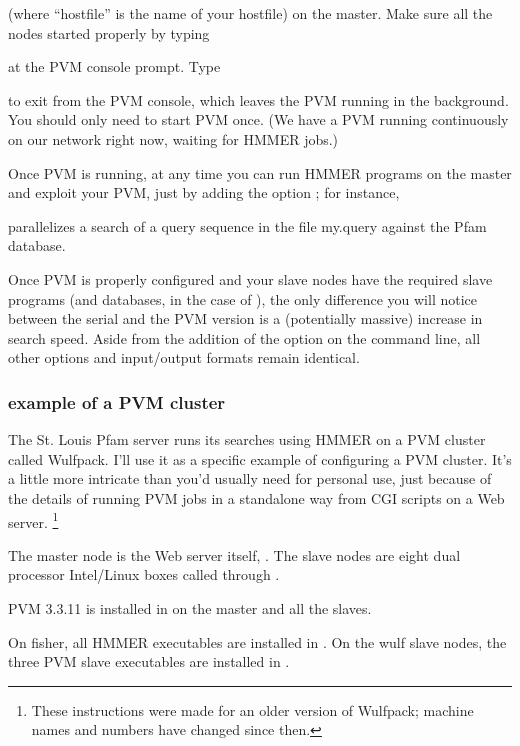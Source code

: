 
(where ``hostfile'' is the name of your hostfile) on the master. Make
sure all the nodes started properly by typing 


at the PVM
console prompt.  Type 


to exit from the PVM console, which leaves the PVM running in the
background.  You should only need to start PVM once. (We have a PVM
running continuously on our network right now, waiting for HMMER
jobs.)

Once PVM is running, at any time you can run HMMER programs on the
master and exploit your PVM, just by adding the option ;
for instance,


parallelizes a search of a query sequence in the file my.query against
the Pfam database.

Once PVM is properly configured and your slave nodes have the required
slave programs (and databases, in the case of ), the
only difference you will notice between the serial and the PVM version
is a (potentially massive) increase in search speed. Aside from the
addition of the  option on the command line, all other
options and input/output formats remain identical.

\subsubsection{example of a PVM cluster}

The St. Louis Pfam server runs its searches using HMMER on a PVM
cluster called Wulfpack. I'll use it as a specific example of
configuring a PVM cluster. It's a little more intricate than you'd
usually need for personal use, just because of the details of running
PVM jobs in a standalone way from CGI scripts on a Web server.
\footnote{These instructions were made for an older version of
Wulfpack; machine names and numbers have changed since then.}

The master node is the Web server itself, . The slave
nodes are eight dual processor Intel/Linux boxes called 
through . 

PVM 3.3.11 is installed in  on the master and
all the slaves.

On fisher, all HMMER executables are installed in
.  On the wulf slave nodes, the three PVM slave
executables are installed in .

